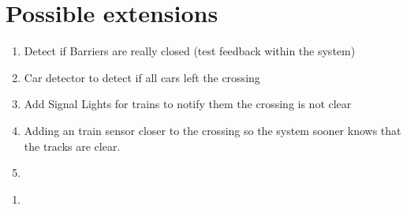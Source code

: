 \documentclass[final]{report}
\begin{document}
\section{Possible extensions}
\begin{enumerate}
\item Detect if Barriers are really closed (test feedback within the system)
\item Car detector to detect if all cars left the crossing
\item Add Signal Lights for trains to notify them the crossing is not clear
\item Adding an train sensor closer to the crossing so the system sooner knows that the tracks are clear.
\item 
\end{enumerate}



\begin{enumerate}
\item 
\end{enumerate}
\end{document}

